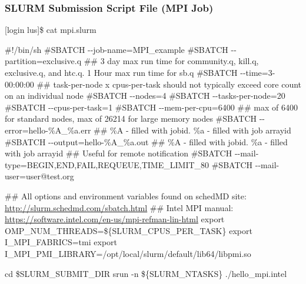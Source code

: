 \documentclass[t,hyperref={pdfpagelabels=false}]{beamer}
\newcommand{\ddash}{-{}-}
\begin{document}
\begin{frame}[fragile]
\frametitle{SLURM Submission Script File (MPI Job)}
\begin{semiverbatim}\tiny
[login lus]\$ cat mpi.slurm

\#!/bin/sh
\#SBATCH \ddash{}job-name=MPI\_example
\#SBATCH \ddash{}partition=exclusive.q
\#\# 3 day max run time for community.q, kill.q, exclusive.q, and htc.q.  1 Hour max run time for sb.q
\#SBATCH \ddash{}time=3-00:00:00 
\#\# task-per-node x cpus-per-task should not typically exceed core count on an individual node 
\#SBATCH \ddash{}nodes=4
\#SBATCH \ddash{}tasks-per-node=20
\#SBATCH \ddash{}cpus-per-task=1
\#SBATCH \ddash{}mem-per-cpu=6400 \#\# max of 6400 for standard nodes, max of 26214 for large memory nodes                                                                                                                                             
\#SBATCH \ddash{}error=hello-\%A\_\%a.err \#\# \%A - filled with jobid. \%a - filled with job arrayid
\#SBATCH \ddash{}output=hello-\%A\_\%a.out \#\# \%A - filled with jobid. \%a - filled with job arrayid
\#\# Useful for remote notification
\#SBATCH \ddash{}mail-type=BEGIN,END,FAIL,REQUEUE,TIME\_LIMIT\_80
\#SBATCH \ddash{}mail-user=user@test.org

\#\# All options and environment variables found on schedMD site: \href{http://slurm.schedmd.com/sbatch.html}{http://slurm.schedmd.com/sbatch.html}
\#\# Intel MPI manual: \href{https://software.intel.com/en-us/mpi-refman-lin-html}{https://software.intel.com/en-us/mpi-refman-lin-html}
export OMP\_NUM\_THREADS=\$\{SLURM\_CPUS\_PER\_TASK\}
export I\_MPI\_FABRICS=tmi  
export I\_MPI\_PMI\_LIBRARY=/opt/local/slurm/default/lib64/libpmi.so

cd \$SLURM\_SUBMIT\_DIR
srun  -n \$\{SLURM\_NTASKS\}  ./hello\_mpi.intel 
\end{semiverbatim}
\end{frame}
\end{document}

